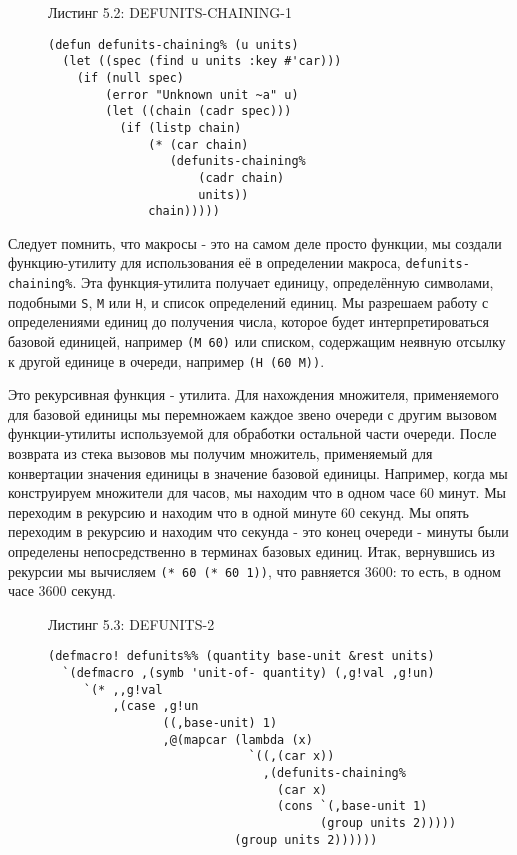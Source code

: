 \begin{figure}Листинг 5.2: DEFUNITS-CHAINING-1\label{listing_5.2}
\listbegin
\begin{verbatim}
(defun defunits-chaining% (u units)
  (let ((spec (find u units :key #'car)))
    (if (null spec)
        (error "Unknown unit ~a" u)
        (let ((chain (cadr spec)))
          (if (listp chain)
              (* (car chain)
                 (defunits-chaining%
                     (cadr chain)
                     units))
              chain)))))
\end{verbatim}
\listend
\end{figure}

Следует помнить, что макросы - это на самом деле просто функции, мы создали функцию-утилиту для использования её в определении макроса, \verb"defunits-chaining%". Эта функция-утилита получает единицу, определённую символами, подобными \verb"S", \verb"M" или \verb"H", и список определений единиц. Мы разрешаем работу с определениями единиц до получения числа, которое будет интерпретироваться базовой единицей, например \verb"(M 60)" или списком, содержащим неявную отсылку к другой единице в очереди, например \verb"(H (60 M))".

Это рекурсивная функция - утилита. Для нахождения множителя, применяемого для базовой единицы мы перемножаем каждое звено очереди с другим вызовом функции-утилиты используемой для обработки остальной части очереди. После возврата из стека вызовов мы получим множитель, применяемый для конвертации значения единицы в значение базовой единицы. Например, когда мы конструируем множители для часов, мы находим что в одном часе 60 минут. Мы переходим в рекурсию и находим что в одной минуте 60 секунд. Мы опять переходим в рекурсию и находим что секунда - это конец очереди - минуты были определены непосредственно в терминах базовых единиц. Итак, вернувшись из рекурсии мы вычисляем \verb"(* 60 (* 60 1))", что равняется 3600: то есть, в одном часе 3600 секунд.

\begin{figure}Листинг 5.3: DEFUNITS-2\label{listing_5.3}
\listbegin
\begin{verbatim}
(defmacro! defunits%% (quantity base-unit &rest units)
  `(defmacro ,(symb 'unit-of- quantity) (,g!val ,g!un)
     `(* ,,g!val
         ,(case ,g!un
                ((,base-unit) 1)
                ,@(mapcar (lambda (x)
                            `((,(car x))
                              ,(defunits-chaining%
                                (car x)
                                (cons `(,base-unit 1)
                                      (group units 2)))))
                          (group units 2))))))
\end{verbatim}
\listend
\end{figure}

